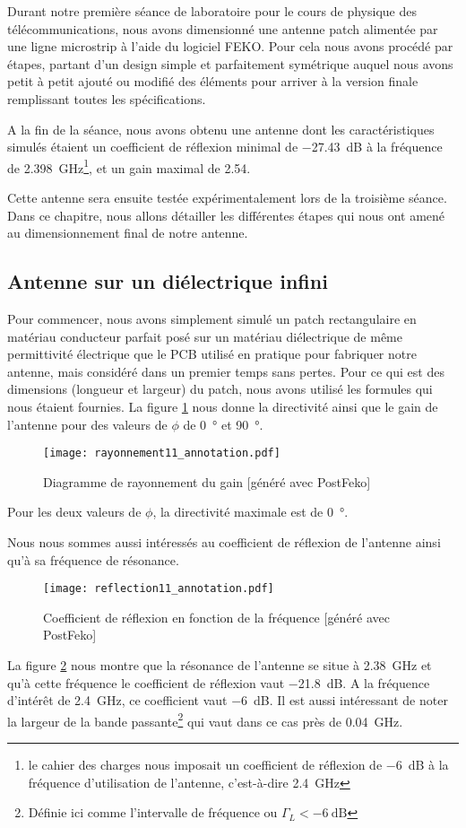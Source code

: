 Durant notre première séance de laboratoire pour le cours de physique des télécommunications, nous avons dimensionné une antenne patch alimentée par une ligne microstrip à l'aide du logiciel FEKO. Pour cela nous avons procédé par étapes, partant d'un design simple et parfaitement symétrique auquel nous avons petit à petit ajouté ou modifié des éléments pour arriver à la version finale remplissant toutes les spécifications.

A la fin de la séance, nous avons obtenu une antenne dont les caractéristiques simulés étaient un coefficient de réflexion minimal de \SI{-27.43}{\deci\bel} à la fréquence de \SI{2.398}{\giga\hertz}\footnote{le cahier des charges nous imposait un coefficient de réflexion de \SI{-6}{\deci\bel} à la fréquence d'utilisation de l'antenne, c'est-à-dire \SI{2.4}{\giga\hertz}}, et un gain maximal de \num{2.54}.

Cette antenne sera ensuite testée expérimentalement lors de la troisième séance. Dans ce chapitre, nous allons détailler les différentes étapes qui nous ont amené au dimensionnement final de notre antenne.

\subsection{Antenne sur un diélectrique infini}
Pour commencer, nous avons simplement simulé un patch rectangulaire en matériau conducteur parfait posé sur un matériau diélectrique de même permittivité électrique que le PCB utilisé en pratique pour fabriquer notre antenne, mais considéré dans un premier temps sans pertes. Pour ce qui est des dimensions (longueur et largeur) du patch, nous avons utilisé les formules qui nous étaient fournies. La figure \ref{fig:rayonnement_11} nous donne la directivité ainsi que le gain de l'antenne pour des valeurs de $\phi$ de \SI{0}{\degree} et \SI{90}{\degree}.
\begin{figure}[htbp]
  \centering
  \texttt{[image: rayonnement11\_annotation.pdf]}
  \caption{Diagramme de rayonnement du gain [généré avec PostFeko]\label{fig:rayonnement_11}}
\end{figure}
Pour les deux valeurs de $\phi$, la directivité maximale est de \SI{0}{\degree}.

Nous nous sommes aussi intéressés au coefficient de réflexion de l'antenne ainsi qu'à sa fréquence de résonance.
\begin{figure}[htbp]
  \centering
  \texttt{[image: reflection11\_annotation.pdf]}
  \caption{Coefficient de réflexion en fonction de la fréquence [généré avec PostFeko]\label{fig:reflection11_}}
\end{figure}
La figure \ref{fig:reflection11_} nous montre que la résonance de l'antenne se situe à \SI{2.38}{\giga\hertz} et qu'à cette fréquence le coefficient de réflexion vaut \SI{-21.8}{\deci\bel}. A la fréquence d'intérêt de \SI{2.4}{\giga\hertz}, ce coefficient vaut \SI{-6}{\deci\bel}. Il est aussi intéressant de noter la largeur de la bande passante\footnote{Définie ici comme l'intervalle de fréquence ou $\Gamma_L < \SI{-6}{\deci\bel}$} qui vaut dans ce cas près de \SI{0.04}{\giga\hertz}.

